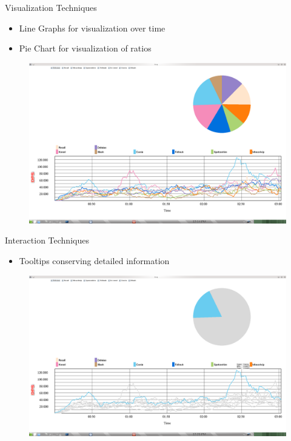 \documentclass{beamer}
\begin{document}
\begin{frame}{Visualization Techniques}
\begin{itemize}
	\item Line Graphs for visualization over time
	\item Pie Chart for visualization of ratios
\end{itemize}
	\begin{figure}
		\includegraphics[width=\textwidth]{viz.png}
	\end{figure}
\end{frame}

\begin{frame}{Interaction Techniques}
\begin{itemize}
	\item Tooltips conserving detailed information
\end{itemize}
	\begin{figure}
		\includegraphics[width=\textwidth]{tooltip.png}
	\end{figure}
\end{frame}
\end{document}
